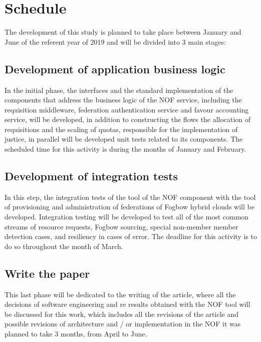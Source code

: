 \documentclass{article}
\begin{document}
\section{Schedule}

The development of this study is planned to take place between January and June of the referent year of 2019 and will be divided into 3 main stages:
\subsection{Development of application business logic}
	In the initial phase, the interfaces and the standard implementation of the components that address the business logic of the NOF service, including the requisition middleware, federation authentication service and favour accounting service, will be developed, in addition to constructing the flows the allocation of requisitions and the scaling of quotas, responsible for the implementation of justice, in parallel will be developed unit tests related to its components. The scheduled time for this activity is during the months of January and February.
\subsection{Development of integration tests}
    In this step, the integration tests of the tool of the NOF component with the tool of provisioning and administration of federations of Fogbow hybrid clouds will be developed. Integration testing will be developed to test all of the most common streams of resource requests, Fogbow sourcing, special non-member member detection cases, and resiliency in cases of error. The deadline for this activity is to do so throughout the month of March.
\subsection{Write the paper}
    This last phase will be dedicated to the writing of the article, where all the decisions of software engineering and re results obtained with the NOF tool will be discussed for this work, which includes all the revisions of the article and possible revisions of architecture and / or implementation in the NOF it was planned to take 3 months, from April to June.
    
\end{document}
